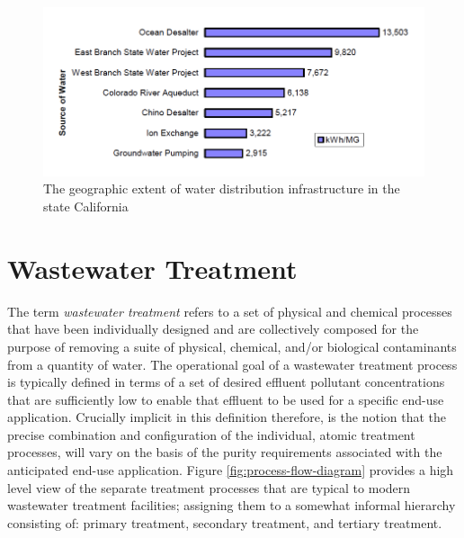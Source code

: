      \begin{figure}[!h]
       \centering
       \includegraphics[width=5.5in]{figures/energy-intensity.png}
       \caption[Energy Intensity of Water Distribution Infrastructure]{The geographic extent of water distribution infrastructure in the state California}
       \label{fig:infrastructure-energy-intensity}
     \end{figure}
     
\section{Wastewater Treatment}

The term \textit{wastewater treatment} refers to a set of physical and chemical processes that have been individually designed and are collectively composed for the purpose of removing a suite of physical, chemical, and/or biological contaminants from a quantity of water. The operational goal of a wastewater treatment process is typically defined in terms of a set of desired effluent pollutant concentrations that are sufficiently low to enable that effluent to be used for a specific end-use application. Crucially implicit in this definition therefore, is the notion that the precise combination and configuration of the individual, atomic treatment processes, will vary on the basis of the purity requirements associated with the anticipated end-use application. Figure \ref{fig:process-flow-diagram} provides a high level view of the separate treatment processes that are typical to modern wastewater treatment facilities; assigning them to a somewhat informal hierarchy consisting of: primary treatment, secondary treatment, and tertiary treatment.

